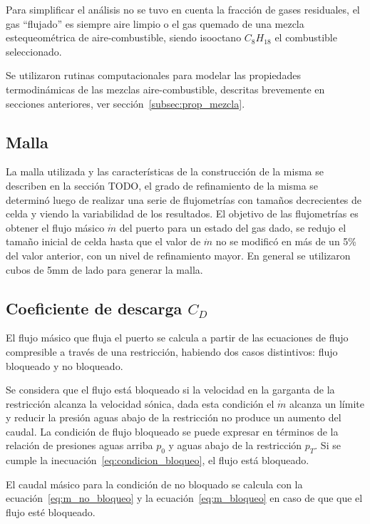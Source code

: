 Para simplificar el análisis no se tuvo en cuenta la fracción de gases
residuales, el gas ``flujado'' es siempre aire limpio o el gas quemado de una
mezcla estequeométrica de aire-combustible, siendo isooctano $C_{8}H_{18}$ el
combustible seleccionado.

Se utilizaron rutinas computacionales para modelar las propiedades
termodinámicas de las mezclas aire-combustible, descritas brevemente en
secciones anteriores, ver sección~\ref{subsec:prop_mezcla}.

\subsection{Malla}

La malla utilizada y las características de la construcción de la misma se
describen en la sección TODO, el grado de refinamiento de la misma se determinó
luego de realizar una serie de flujometrías con tamaños decrecientes de celda y
viendo la variabilidad de los resultados.
%
El objetivo de las flujometrías es obtener el flujo másico $\dot{m}$ del puerto
para un estado del gas dado, se redujo el tamaño inicial de celda hasta que el
valor de $\dot{m}$ no se modificó en más de un 5\% del valor anterior, con un
nivel de refinamiento mayor.
%
En general se utilizaron cubos de 5mm de lado para generar la malla.

\subsection{Coeficiente de descarga $C_{D}$}

El flujo másico que fluja el puerto se calcula a partir de las ecuaciones de
flujo compresible a través de una restricción, habiendo dos casos distintivos:
flujo bloqueado y no bloqueado.

Se considera que el flujo está bloqueado si la velocidad en la garganta de la
restricción alcanza la velocidad sónica, dada esta condición el $\dot{m}$
alcanza un límite y reducir la presión aguas abajo de la restricción no produce
un aumento del caudal.
%
La condición de flujo bloqueado se puede expresar en términos de la relación de
presiones aguas arriba $p_{0}$ y aguas abajo de la restricción $p_{T}$.
%
Si se cumple la inecuación~\ref{eq:condicion_bloqueo}, el flujo está bloqueado.

El caudal másico para la condición de no bloquado se calcula con la
ecuación~\ref{eq:m_no_bloqueo} y la ecuación~\ref{eq:m_bloqueo} en caso de que
que el flujo esté bloqueado.

